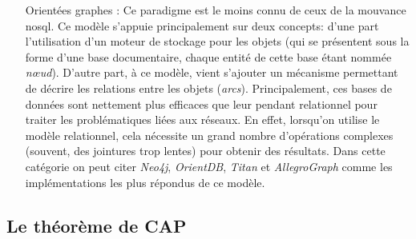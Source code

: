 \begin{itemize}
  \item [Orientées graphes]: Ce paradigme est le moins connu de ceux
    de la mouvance \acrshort{nosql}. Ce modèle s'appuie principalement
    sur deux concepts: d'une part l'utilisation d'un moteur de
    stockage pour les objets (qui se présentent sous la forme d'une
    base documentaire, chaque entité de cette base étant nommée
    \emph{nœud}). D'autre part, à ce modèle, vient s'ajouter un
    mécanisme permettant de décrire les relations entre les objets
    (\emph{arcs}). Principalement, ces bases de données sont nettement
    plus efficaces que leur pendant relationnel pour traiter les
    problématiques liées aux réseaux.  En effet, lorsqu'on utilise le
    modèle relationnel, cela nécessite un grand nombre d'opérations
    complexes (souvent, des jointures trop lentes) pour obtenir des
    résultats. Dans cette catégorie on peut citer \emph{Neo4j},
    \emph{OrientDB}, \emph{Titan} et \emph{AllegroGraph} comme les
    implémentations les plus répondus de ce modèle.
  \end{itemize}
  \newpage
  \subsection{Le théorème de CAP \cite{brewer2000towards}}
 
\newpage
